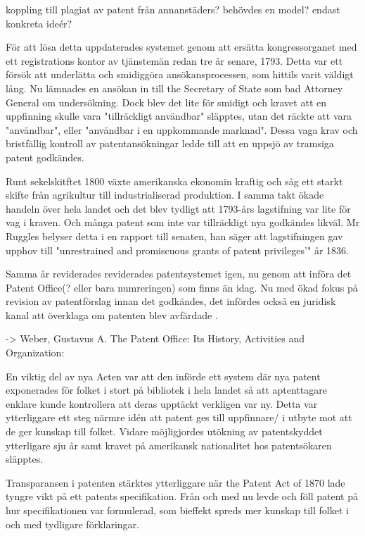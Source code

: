 koppling till plagiat av patent från annanstäders? behövdes en model? endast konkreta ideér?

För att lösa detta uppdaterades systemet genom att ersätta kongressorganet med ett registrations kontor
av tjänstemän redan tre år senare, 1793. Detta var ett försök att underlätta och smidiggöra
ansökansprocessen, som hittils varit väldigt lång. Nu lämnades en ansökan in till the Secretary of State
som bad Attorney General om undersökning. Dock blev det lite för smidigt och kravet att en uppfinning
skulle vara "tillräckligt användbar" släpptes, utan det räckte att vara "användbar", eller "användbar i
en uppkommande marknad". Dessa vaga krav och bristfällig kontroll av patentansökningar ledde till att en
uppsjö av tramsiga patent godkändes\cite{nard}.

Runt sekelskitftet 1800 växte amerikanska ekonomin kraftig och såg ett starkt skifte från agrikultur
till industrialiserad produktion. I samma takt ökade handeln över hela landet och det blev tydligt att 1793-års lagstifning var lite för vag i kraven. Och många patent som inte var tillräckligt nya godkändes likväl\cite{nard}. Mr Ruggles belyser detta i en rapport till senaten, han säger att lagstifningen gav upphov till "unrestrained and promiscuous grants of patent privileges’" \cite{ruggles} år 1836.

Samma år reviderades reviderades patentsystemet igen, nu genom att införa det Patent
Office(? eller bara numreringen) som finns än idag. Nu med ökad fokus på revision av patentförslag innan
det godkändes, det infördes också en juridisk kanal att överklaga om patenten blev avfärdade \cite{nard}.

-> Weber, Gustavus A. The Patent Office: Its History, Activities and Organization:

En viktig del av nya Acten var att den införde ett system där nya patent exponerades för folket i stort
på bibliotek i hela landet så att aptenttagare enklare kunde kontrollera att deras upptäckt verkligen
var ny\cite{watson}. Detta var ytterliggare ett steg närmre idén att patent ges till uppfinnare/ i
utbyte mot att de ger kunskap till folket. Vidare möjligjordes utökning av patentskyddet ytterligare sju
år \cite{watson} samt kravet på amerikansk nationalitet hos patentsökaren släpptes.

Transparansen i patenten stärktes ytterliggare när the Patent Act of 1870 lade tyngre vikt på ett
patents specifikation. Från och med nu levde och föll patent på hur specifikationen var formulerad, som
bieffekt spreds mer kunskap till folket i och med tydligare förklaringar\cite{nard}.

